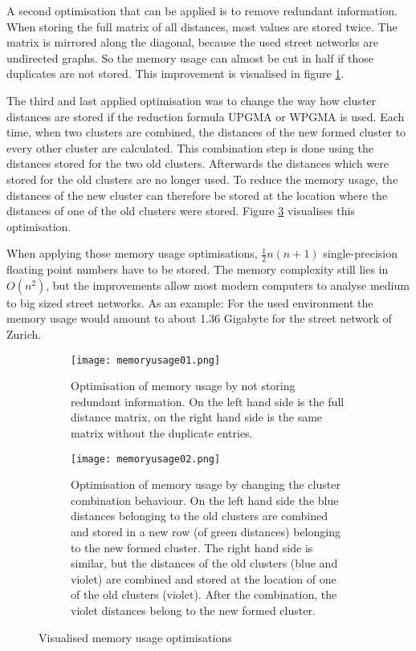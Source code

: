 A second optimisation that can be applied is to remove redundant information. When storing the full matrix of all distances, most values are stored twice. The matrix is mirrored along the diagonal, because the used street networks are undirected graphs. So the memory usage can almost be cut in half if those duplicates are not stored. This improvement is visualised in figure \ref{fig:memory_usage_01}.

The third and last applied optimisation was to change the way how cluster distances are stored if the reduction formula \acrshort{UPGMA} or \acrshort{WPGMA} is used. Each time, when two clusters are combined, the distances of the new formed cluster to every other cluster are calculated. This combination step is done using the distances stored for the two old clusters. Afterwards the distances which were stored for the old clusters are no longer used. To reduce the memory usage, the distances of the new cluster can therefore be stored at the location where the distances of one of the old clusters were stored. Figure \ref{fig:memory_usage_02} visualises this optimisation.

When applying those memory usage optimisations, $\frac{1}{2}n(n+1)$ single-precision floating point numbers have to be stored. The memory complexity still lies in $O(n^2)$, but the improvements allow most modern computers to analyse medium to big sized street networks. As an example: For the used environment the memory usage would amount to about 1.36 Gigabyte for the street network of Zurich.

\begin{figure}
    \centering
    \begin{subfigure}[b]{\textwidth}
        \texttt{[image: memoryusage01.png]}
        \caption{Optimisation of memory usage by not storing redundant information. On the left hand side is the full distance matrix, on the right hand side is the same matrix without the duplicate entries.}
        \label{fig:memory_usage_01}
    \end{subfigure}
    \par\medskip
    \begin{subfigure}[b]{\textwidth}
        \texttt{[image: memoryusage02.png]}
        \caption{Optimisation of memory usage by changing the cluster combination behaviour. On the left hand side the blue distances belonging to the old clusters are combined and stored in a new row (of green distances) belonging to the new formed cluster. The right hand side is similar, but the distances of the old clusters (blue and violet) are combined and stored at the location of one of the old clusters (violet). After the combination, the violet distances belong to the new formed cluster.}
        \label{fig:memory_usage_02}
    \end{subfigure}
    \caption{Visualised memory usage optimisations}
\end{figure}

